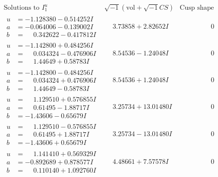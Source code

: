 \documentclass[1p]{elsarticle_modified}
\theoremstyle{definition}
\newcommand{\I}{\sqrt{-1}}
\begin{document}
$$\begin{array}{c|c|c}
\text{Solutions to }I^u_{1}& \I (\text{vol} + \sqrt{-1}CS) & \text{Cusp shape}\\
 \hline 
\begin{aligned}
u &= -1.128380 - 0.514252 I \\
a &= -0.064006 - 0.139002 I \\
b &= \phantom{-}0.342622 - 0.417812 I\end{aligned}
 & \phantom{-}3.73858 + 2.82652 I & \phantom{-0.000000 } 0 \\ \hline\begin{aligned}
u &= -1.142800 + 0.484256 I \\
a &= \phantom{-}0.034324 - 0.476906 I \\
b &= \phantom{-}1.44649 + 0.58783 I\end{aligned}
 & \phantom{-}8.54536 - 1.24048 I & \phantom{-0.000000 } 0 \\ \hline\begin{aligned}
u &= -1.142800 - 0.484256 I \\
a &= \phantom{-}0.034324 + 0.476906 I \\
b &= \phantom{-}1.44649 - 0.58783 I\end{aligned}
 & \phantom{-}8.54536 + 1.24048 I & \phantom{-0.000000 } 0 \\ \hline\begin{aligned}
u &= \phantom{-}1.129510 + 0.576855 I \\
a &= \phantom{-}0.61495 - 1.88717 I \\
b &= -1.43606 - 0.65679 I\end{aligned}
 & \phantom{-}3.25734 + 13.01480 I & \phantom{-0.000000 } 0 \\ \hline\begin{aligned}
u &= \phantom{-}1.129510 - 0.576855 I \\
a &= \phantom{-}0.61495 + 1.88717 I \\
b &= -1.43606 + 0.65679 I\end{aligned}
 & \phantom{-}3.25734 - 13.01480 I & \phantom{-0.000000 } 0 \\ \hline\begin{aligned}
u &= \phantom{-}1.141410 + 0.569329 I \\
a &= -0.892689 + 0.878577 I \\
b &= \phantom{-}0.110140 + 1.092760 I\end{aligned}
 & \phantom{-}4.48661 + 7.57578 I & \phantom{-0.000000 } 0 \\ \hline\begin{aligned}

\end{aligned}
\end{array}$$
\end{document}
